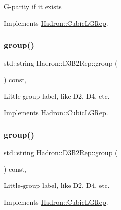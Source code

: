 G-\/parity if it exists 

Implements \mbox{\hyperlink{structHadron_1_1CubicLGRep_ace26f7b2d55e3a668a14cb9026da5231}{Hadron\+::\+Cubic\+L\+G\+Rep}}.

\mbox{\label{structHadron_1_1D3B2Rep_a369bb27633b844c9d9a2023f27cfff74}} 
\subsubsection{\texorpdfstring{group()}{group()}\hspace{0.1cm}{\footnotesize\ttfamily [1/3]}}
{\footnotesize\ttfamily std\+::string Hadron\+::\+D3\+B2\+Rep\+::group (\begin{DoxyParamCaption}{ }\end{DoxyParamCaption}) const\hspace{0.3cm}{\ttfamily [inline]}, {\ttfamily [virtual]}}

Little-\/group label, like D2, D4, etc. 

Implements \mbox{\hyperlink{structHadron_1_1CubicLGRep_a9bdb14b519a611d21379ed96a3a9eb41}{Hadron\+::\+Cubic\+L\+G\+Rep}}.

\mbox{\label{structHadron_1_1D3B2Rep_a369bb27633b844c9d9a2023f27cfff74}} 
\subsubsection{\texorpdfstring{group()}{group()}\hspace{0.1cm}{\footnotesize\ttfamily [2/3]}}
{\footnotesize\ttfamily std\+::string Hadron\+::\+D3\+B2\+Rep\+::group (\begin{DoxyParamCaption}{ }\end{DoxyParamCaption}) const\hspace{0.3cm}{\ttfamily [inline]}, {\ttfamily [virtual]}}

Little-\/group label, like D2, D4, etc. 

Implements \mbox{\hyperlink{structHadron_1_1CubicLGRep_a9bdb14b519a611d21379ed96a3a9eb41}{Hadron\+::\+Cubic\+L\+G\+Rep}}.

\mbox{\label{structHadron_1_1D3B2Rep_a369bb27633b844c9d9a2023f27cfff74}} 
